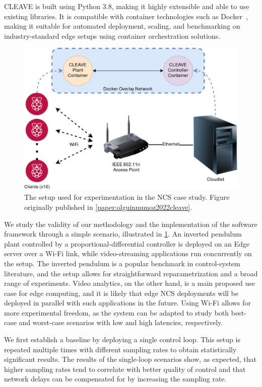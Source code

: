 \gls{CLEAVE} is built using Python 3.8, making it highly extensible and able to use existing libraries.
It is compatible with container technologies such as Docker~\cite{docker}, making it suitable for automated deployment, scaling, and benchmarking on industry-standard edge setups using container orchestration solutions.

\begin{figure}
    \centering
    \includegraphics[width=.9\textwidth]{publications/2022CLEAVE/images/CLEAVE_experiment_setup}
    \caption{
        The setup used for experimentation in the \gls{NCS} case study.
        Figure originally published in \cref{paper:olguinmunoz2022cleave}.
    }\label{fig:cleavesetup}
\end{figure}

\medskip
We study the validity of our methodology and the implementation of the software framework through a simple scenario, illustrated in \cref{fig:cleavesetup}.
An inverted pendulum plant controlled by a proportional-differential controller is deployed on an Edge server over a Wi-Fi link, while video-streaming applications run concurrently on the setup.
The inverted pendulum is a popular benchmark in control-system literature, and the setup allows for straightforward reparametrization and a broad range of experiments.
Video analytics, on the other hand, is a main proposed use case for edge computing, and it is likely that edge \gls{NCS} deployments will be deployed in parallel with such applications in the future.
Using Wi-Fi allows for more experimental freedom, as the system can be adapted to study both best-case and worst-case scenarios with low and high latencies, respectively.

We first establish a baseline by deploying a single control loop.
This setup is repeated multiple times with different sampling rates to obtain statistically significant results.
The results of the single-loop scenarios show, as expected, that higher sampling rates tend to correlate with better quality of control and that network delays can be compensated for by increasing the sampling rate.

